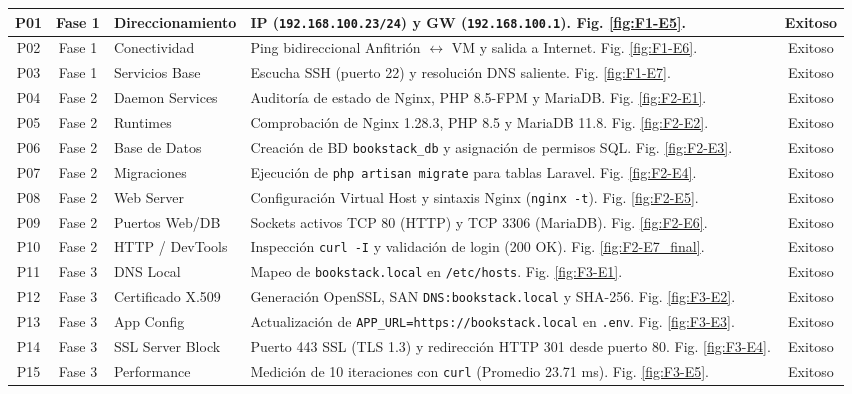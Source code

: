 \documentclass[12pt,a4paper]{article}
\begin{document}
\begin{xltabular}{\textwidth}{|c|c|>{\raggedright\arraybackslash}p{2.3cm}|X|c|}
P01 & Fase 1 & Direccionamiento & IP (\texttt{192.168.100.23/24}) y GW (\texttt{192.168.100.1}). Fig. \ref{fig:F1-E5}. & Exitoso \\ \hline
P02 & Fase 1 & Conectividad & Ping bidireccional Anfitrión $\leftrightarrow$ VM y salida a Internet. Fig. \ref{fig:F1-E6}. & Exitoso \\ \hline
P03 & Fase 1 & Servicios Base & Escucha SSH (puerto 22) y resolución DNS saliente. Fig. \ref{fig:F1-E7}. & Exitoso \\ \hline
P04 & Fase 2 & Daemon Services & Auditoría de estado de Nginx, PHP 8.5-FPM y MariaDB. Fig. \ref{fig:F2-E1}. & Exitoso \\ \hline
P05 & Fase 2 & Runtimes & Comprobación de Nginx 1.28.3, PHP 8.5 y MariaDB 11.8. Fig. \ref{fig:F2-E2}. & Exitoso \\ \hline
P06 & Fase 2 & Base de Datos & Creación de BD \texttt{bookstack\_db} y asignación de permisos SQL. Fig. \ref{fig:F2-E3}. & Exitoso \\ \hline
P07 & Fase 2 & Migraciones & Ejecución de \texttt{php artisan migrate} para tablas Laravel. Fig. \ref{fig:F2-E4}. & Exitoso \\ \hline
P08 & Fase 2 & Web Server & Configuración Virtual Host y sintaxis Nginx (\texttt{nginx -t}). Fig. \ref{fig:F2-E5}. & Exitoso \\ \hline
P09 & Fase 2 & Puertos Web/DB & Sockets activos TCP 80 (HTTP) y TCP 3306 (MariaDB). Fig. \ref{fig:F2-E6}. & Exitoso \\ \hline
P10 & Fase 2 & HTTP / DevTools & Inspección \texttt{curl -I} y validación de login (200 OK). Fig. \ref{fig:F2-E7_final}. & Exitoso \\ \hline
P11 & Fase 3 & DNS Local & Mapeo de \texttt{bookstack.local} en \texttt{/etc/hosts}. Fig. \ref{fig:F3-E1}. & Exitoso \\ \hline
P12 & Fase 3 & Certificado X.509 & Generación OpenSSL, SAN \texttt{DNS:bookstack.local} y SHA-256. Fig. \ref{fig:F3-E2}. & Exitoso \\ \hline
P13 & Fase 3 & App Config & Actualización de \texttt{APP\_URL=https://bookstack.local} en \texttt{.env}. Fig. \ref{fig:F3-E3}. & Exitoso \\ \hline
P14 & Fase 3 & SSL Server Block & Puerto 443 SSL (TLS 1.3) y redirección HTTP 301 desde puerto 80. Fig. \ref{fig:F3-E4}. & Exitoso \\ \hline
P15 & Fase 3 & Performance & Medición de 10 iteraciones con \texttt{curl} (Promedio 23.71 ms). Fig. \ref{fig:F3-E5}. & Exitoso \\ \hline

\end{xltabular}
\end{document}
